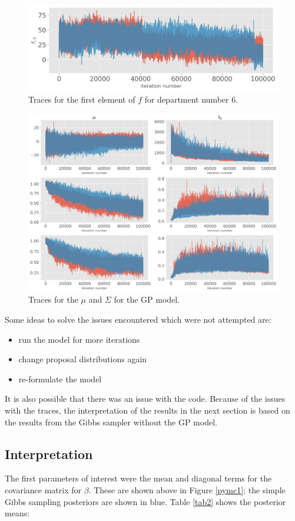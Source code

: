 \documentclass[paper=a4, fontsize=11pt]{scrartcl}
\begin{document}
\begin{figure}[!htb]
\centering
\includegraphics[width=.8\textwidth]{project/writeup/f.png}
\caption{Traces for the first element of $f$ for department number 6.}
\label{f}\end{figure}




\begin{figure}[!htb]
\centering
\includegraphics[width=.8\textwidth]{project/writeup/traces_all.png}
\caption{Traces for the $\mu$ and $\Sigma$ for the GP model.}\end{figure}


Some ideas to solve the issues encountered which were not attempted are:
\begin{itemize}[noitemsep]
    \item run the model for more iterations
    \item change proposal distributions again
    \item re-formulate the model
\end{itemize}
It is also possible that there was an issue with the code. Because of the issues with the traces, the interpretation of the results in the next section is based on the results from the Gibbs sampler without the GP model.

\clearpage


\subsection{Interpretation}
The first parameters of interest were the mean and diagonal terms for the covariance matrix for $\beta$. These are shown above in Figure \ref{pymc1}; the simple Gibbs sampling posteriors are shown in blue. Table \ref{tab2} shows the posterior means:\\
\end{document}
